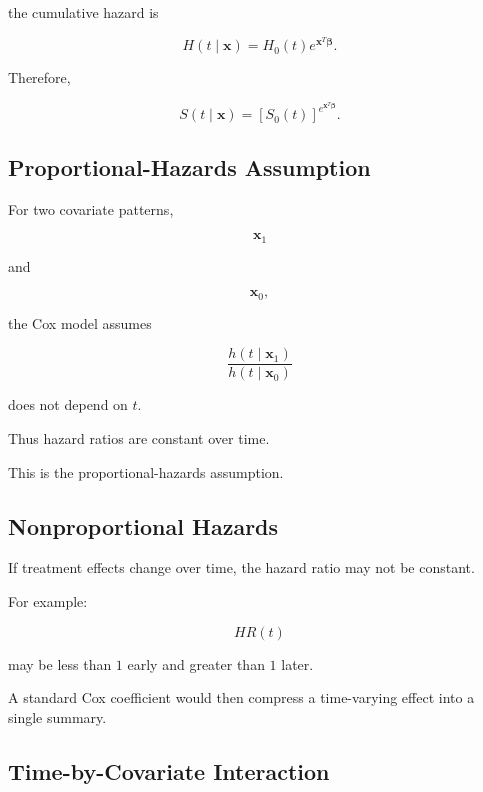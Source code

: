 the cumulative hazard is

\[
\boxed{
H
(
t\mid\mathbf{x}
)
=
H_0(t)
e^{\mathbf{x}^T\boldsymbol{\beta}}.
}
\]

Therefore,

\[
\boxed{
S
(
t\mid\mathbf{x}
)
=
[
S_0(t)
]^{
e^{\mathbf{x}^T\boldsymbol{\beta}}
}.
}
\]

\subsection{Proportional-Hazards Assumption}
\label{subsec:ph-assumption}

For two covariate patterns,

\[
\mathbf{x}_1
\]

and

\[
\mathbf{x}_0,
\]

the Cox model assumes

\[
\boxed{
\frac{
h(t\mid\mathbf{x}_1)
}{
h(t\mid\mathbf{x}_0)
}
}
\]

does not depend on \(t\).

Thus hazard ratios are constant over time.

This is the proportional-hazards assumption.

\subsection{Nonproportional Hazards}
\label{subsec:nonproportional-hazards}

If treatment effects change over time, the hazard ratio may not be
constant.

For example:

\[
\boxed{
HR(t)
}
\]

may be less than \(1\) early and greater than \(1\) later.

A standard Cox coefficient would then compress a time-varying effect into
a single summary.

\subsection{Time-by-Covariate Interaction}
\label{subsec:time-covariate-interaction}

